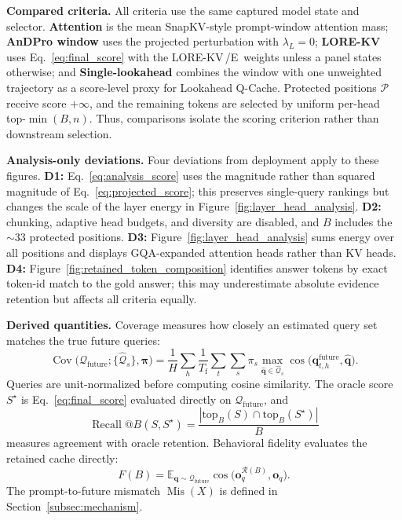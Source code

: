 \documentclass{article} %
\newcommand{\lorekvE}{LORE-KV\,/E}
\begin{document}
\textbf{Compared criteria.}
All criteria use the same captured model state and selector. \textbf{Attention} is the mean SnapKV-style prompt-window attention mass; \textbf{AnDPro window} uses the projected perturbation with $\lambda_L{=}0$; \textbf{LORE-KV} uses Eq.~\ref{eq:final_score} with the \lorekvE\ weights unless a panel states otherwise; and \textbf{Single-lookahead} combines the window with one unweighted trajectory as a score-level proxy for Lookahead Q-Cache. Protected positions $\mathcal{P}$ receive score $+\infty$, and the remaining tokens are selected by uniform per-head top-$\min(B,n)$. Thus, comparisons isolate the scoring criterion rather than downstream selection.

\textbf{Analysis-only deviations.}
Four deviations from deployment apply to these figures. \textbf{D1:} Eq.~\ref{eq:analysis_score} uses the magnitude rather than squared magnitude of Eq.~\ref{eq:projected_score}; this preserves single-query rankings but changes the scale of the layer energy in Figure~\ref{fig:layer_head_analysis}. \textbf{D2:} chunking, adaptive head budgets, and diversity are disabled, and $B$ includes the ${\sim}33$ protected positions. \textbf{D3:} Figure~\ref{fig:layer_head_analysis} sums energy over all positions and displays GQA-expanded attention heads rather than KV heads. \textbf{D4:} Figure~\ref{fig:retained_token_composition} identifies answer tokens by exact token-id match to the gold answer; this may underestimate absolute evidence retention but affects all criteria equally.

\textbf{Derived quantities.}
Coverage measures how closely an estimated query set matches the true future queries:
\begin{equation}
\operatorname{Cov}\big(\mathcal{Q}_{\mathrm{future}};
\{\hat{\mathcal{Q}}_s\},\boldsymbol{\pi}\big)
=
\frac{1}{H}\sum_h
\frac{1}{T_{\mathrm f}}\sum_t
\sum_s \pi_s
\max_{\hat{\mathbf q}\in\hat{\mathcal Q}_s}
\cos\!\big(
\mathbf q^{\mathrm{future}}_{t,h},
\hat{\mathbf q}
\big).
\label{eq:coverage}
\end{equation}
Queries are unit-normalized before computing cosine similarity. The oracle score $S^\star$ is Eq.~\ref{eq:final_score} evaluated directly on $\mathcal{Q}_{\mathrm{future}}$, and
\begin{equation}
\operatorname{Recall}@B(S,S^\star)
=
\frac{
\left|\mathrm{top}_B(S)\cap\mathrm{top}_B(S^\star)\right|
}{B}
\label{eq:recall_at_b}
\end{equation}
measures agreement with oracle retention. Behavioral fidelity evaluates the retained cache directly:
\begin{equation}
F(B)
=
\mathbb{E}_{\mathbf q\sim\mathcal Q_{\mathrm{future}}}
\cos\!\big(
\mathbf o^{\mathcal R(B)}_q,
\mathbf o_q
\big).
\label{eq:fidelity}
\end{equation}
The prompt-to-future mismatch $\operatorname{Mis}(X)$ is defined in
Section~\ref{subsec:mechanism}.
\end{document}
